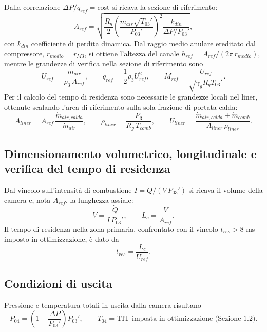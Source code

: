 Dalla correlazione $\Delta P/q_{ref} = \text{cost}$ si ricava la sezione di riferimento:
\begin{equation*}
    A_{ref} = \sqrt{\frac{R_g}{2}\left(\frac{\dot{m}_{air}\sqrt{T_{03}'}}{P_{03}'}\right)^2 \frac{k_{din}}{\Delta P/P_{03}'}},
\end{equation*}
con $k_{din}$ coefficiente di perdita dinamica. Dal raggio medio anulare ereditato dal compressore, $r_{medio} = r_{M3}$, si ottiene l'altezza del canale $h_{ref} = A_{ref}/(2\pi\,r_{medio})$, mentre le grandezze di verifica nella sezione di riferimento sono
\begin{equation*}
    U_{ref} = \frac{\dot{m}_{air}}{\rho_3\,A_{ref}}, \qquad q_{ref} = \frac{1}{2}\rho_3 U_{ref}^2, \qquad M_{ref} = \frac{U_{ref}}{\sqrt{\gamma_g R_g T_{03}'}}.
\end{equation*}
Per il calcolo del tempo di residenza sono necessarie le grandezze locali nel liner, ottenute scalando l'area di riferimento sulla sola frazione di portata calda:
\begin{equation*}
    A_{liner} = A_{ref}\,\frac{\dot{m}_{air,calda}}{\dot{m}_{air}}, \qquad \rho_{liner} = \frac{P_3}{R_g\,T_{comb}}, \qquad U_{liner} = \frac{\dot{m}_{air,calda} + \dot{m}_{comb}}{A_{liner}\,\rho_{liner}}.
\end{equation*}

\subsection{Dimensionamento volumetrico, longitudinale e verifica del tempo di residenza}

Dal vincolo sull'intensità di combustione $I = \dot{Q}/(V\,P_{03}')$ si ricava il volume della camera e, nota $A_{ref}$, la lunghezza assiale:
\begin{equation*}
    V = \frac{\dot{Q}}{I\,P_{03}'}, \qquad L_c = \frac{V}{A_{ref}}.
\end{equation*}
Il tempo di residenza nella zona primaria, confrontato con il vincolo $t_{res} > 8$ ms imposto in ottimizzazione, è dato da
\begin{equation*}
    t_{res} = \frac{L_c}{U_{ref}}.
\end{equation*}

\subsection{Condizioni di uscita}

Pressione e temperatura totali in uscita dalla camera risultano
\begin{equation*}
    P_{04} = \left(1 - \frac{\Delta P}{P_{03}'}\right)P_{03}', \qquad T_{04} = \text{TIT imposta in ottimizzazione (Sezione 1.2)}.
\end{equation*}

